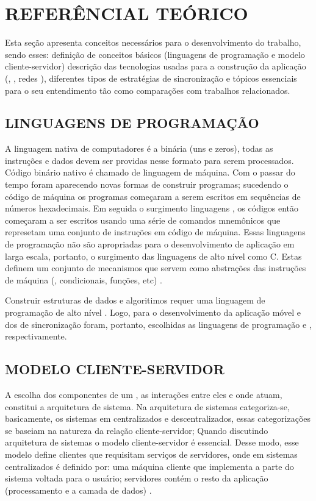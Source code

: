 \section{REFERÊNCIAL TEÓRICO}

Esta seção apresenta conceitos necessários para o desenvolvimento do trabalho, sendo esses: definição de conceitos básicos (linguagens de programação e modelo cliente-servidor) descrição das tecnologias usadas para a construção da aplicação (, , redes ), diferentes tipos de estratégias de sincronização e tópicos essenciais para o seu entendimento tão como comparações com trabalhos relacionados.

\subsection{LINGUAGENS DE PROGRAMAÇÃO}

A linguagem nativa de computadores é a binária (uns e zeros), todas as instruções e dados devem ser providas nesse formato para serem processados. Código binário nativo é chamado de linguagem de máquina. Com o passar do tempo foram aparecendo novas formas de construir programas; sucedendo o código de máquina os programas começaram a serem escritos em sequências de números hexadecimais. Em seguida o surgimento linguagens , os códigos então começaram a ser escritos usando uma série de comandos mnemônicos que represetam uma conjunto de instruções em código de máquina. Essas linguagens de programação não são apropriadas para o desenvolvimento de aplicação em larga escala, portanto, o surgimento das linguagens de alto nível como C. Estas definem um conjunto de mecanismos que servem como abstrações das instruções de máquina (, condicionais, funções, etc) \cite{Bailey2005IntroductionC}.

  Construir estruturas de dados e algoritimos requer uma linguagem de programação de alto nível \cite{GoodrichTamassiaMount2011DataStructuresCpp}. Logo, para o desenvolvimento da aplicação móvel e dos  de sincronização foram, portanto, escolhidas as linguagens de programação  e , respectivamente.  

\subsection{MODELO CLIENTE-SERVIDOR}

A escolha dos componentes de um , as interações entre eles e onde atuam, constitui a arquitetura de sistema. Na arquitetura de sistemas categoriza-se, basicamente, os sistemas em centralizados e descentralizados, essas categorizações se baseiam na natureza da relação cliente-servidor; Quando discutindo arquitetura de sistemas o modelo cliente-servidor é essencial. Desse modo, esse modelo define clientes que requisitam serviços de servidores, onde em sistemas centralizados é definido por: uma máquina cliente que implementa a parte do sistema voltada para o usuário; servidores contém o resto da aplicação (processamento e a camada de dados) \cite{tanenbaum2007dist}.

